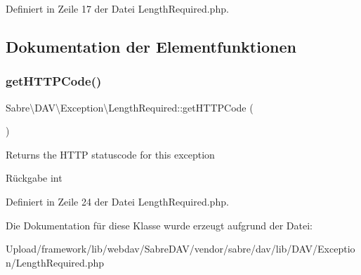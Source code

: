 Definiert in Zeile 17 der Datei Length\+Required.\+php.



\subsection{Dokumentation der Elementfunktionen}
\mbox{\label{class_sabre_1_1_d_a_v_1_1_exception_1_1_length_required_af9c272ad868428c14177e5076405adce}} 
\subsubsection{\texorpdfstring{get\+H\+T\+T\+P\+Code()}{getHTTPCode()}}
{\footnotesize\ttfamily Sabre\textbackslash{}\+D\+A\+V\textbackslash{}\+Exception\textbackslash{}\+Length\+Required\+::get\+H\+T\+T\+P\+Code (\begin{DoxyParamCaption}{ }\end{DoxyParamCaption})}

Returns the H\+T\+TP statuscode for this exception

\begin{DoxyReturn}{Rückgabe}
int 
\end{DoxyReturn}


Definiert in Zeile 24 der Datei Length\+Required.\+php.



Die Dokumentation für diese Klasse wurde erzeugt aufgrund der Datei\+:\begin{DoxyCompactItemize}
\item 
Upload/framework/lib/webdav/\+Sabre\+D\+A\+V/vendor/sabre/dav/lib/\+D\+A\+V/\+Exception/Length\+Required.\+php\end{DoxyCompactItemize}
